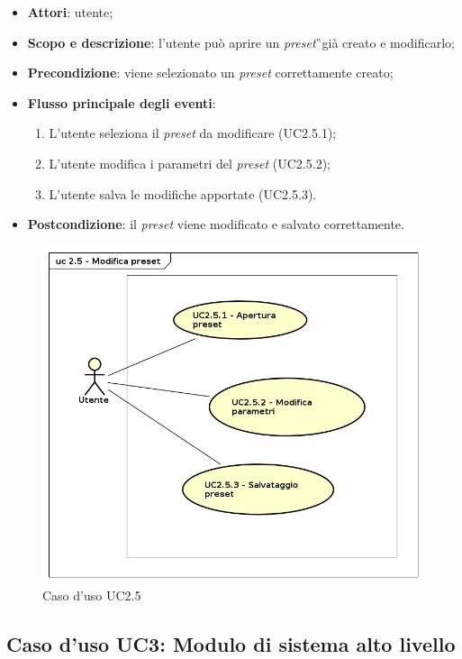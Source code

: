\begin{itemize}
\item \textbf{Attori}: utente;
\item \textbf{Scopo e descrizione}: l'utente può aprire un \textit{preset}\G\ già creato e modificarlo;
\item \textbf{Precondizione}: viene selezionato un \textit{preset} correttamente creato; 
\item \textbf{Flusso principale degli eventi}:
\begin{enumerate}
\item L'utente seleziona il \textit{preset} da modificare (UC2.5.1);
\item L'utente modifica i parametri del \textit{preset} (UC2.5.2);
\item L'utente salva le modifiche apportate (UC2.5.3).
\end{enumerate}
\item \textbf{Postcondizione}: il \textit{preset} viene modificato e salvato correttamente.
\end{itemize}
\begin{figure}[htbp]
\centering
\includegraphics[scale=0.5]{immagini/uc2_5_modifica_preset.png}
\captionsetup{labelfont=bf}
\caption{Caso d'uso UC2.5}
\end{figure}
\newpage

\subsection{Caso d'uso UC3: Modulo di sistema alto livello}
\label{sec:UC3}

